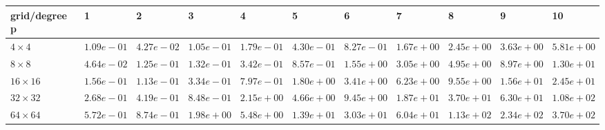 \begin{tabular}{lllllllllll}
\hline
 grid/degree p   & 1          & 2          & 3          & 4          & 5          & 6          & 7          & 8          & 9          & 10         \\
\hline
 $4 \times 4$    & $1.09e-01$ & $4.27e-02$ & $1.05e-01$ & $1.79e-01$ & $4.30e-01$ & $8.27e-01$ & $1.67e+00$ & $2.45e+00$ & $3.63e+00$ & $5.81e+00$ \\
 $8 \times 8$    & $4.64e-02$ & $1.25e-01$ & $1.32e-01$ & $3.42e-01$ & $8.57e-01$ & $1.55e+00$ & $3.05e+00$ & $4.95e+00$ & $8.97e+00$ & $1.30e+01$ \\
 $16 \times 16$  & $1.56e-01$ & $1.13e-01$ & $3.34e-01$ & $7.97e-01$ & $1.80e+00$ & $3.41e+00$ & $6.23e+00$ & $9.55e+00$ & $1.56e+01$ & $2.45e+01$ \\
 $32 \times 32$  & $2.68e-01$ & $4.19e-01$ & $8.48e-01$ & $2.15e+00$ & $4.66e+00$ & $9.45e+00$ & $1.87e+01$ & $3.70e+01$ & $6.30e+01$ & $1.08e+02$ \\
 $64 \times 64$  & $5.72e-01$ & $8.74e-01$ & $1.98e+00$ & $5.48e+00$ & $1.39e+01$ & $3.03e+01$ & $6.04e+01$ & $1.13e+02$ & $2.34e+02$ & $3.70e+02$ \\
\hline
\end{tabular}